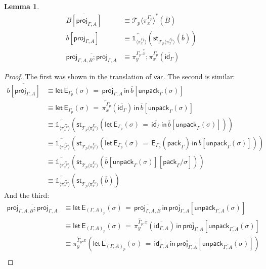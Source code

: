 \documentclass[10pt]{article}
\newtheorem{lemma}{Lemma}
\theoremstyle{definition}
\newcommand{\id}{\mathsf{id}}
\newcommand{\rewrite}[2]{\overleftarrow{#1}(#2)}
\newcommand\St[2]{\ensuremath{{#1}^*(#2)}}
\newcommand\StI[2]{\ensuremath{\mathsf{st}_{#1}(#2)}}
\newcommand\EEs[4]{\ensuremath{\mathsf{let} \, \mathsf{E}_{#1}(#3) \, = \, {#2} \, \mathsf{in} \, #4}}
\newcommand\EIs[2]{\ensuremath{\mathsf{E}_{#1}{(#2)}}}
\newcommand\ApEl[2]{\mathcal{T}_{#1}\langle#2\rangle}
\newcommand\pack[1]{\ensuremath{\mathsf{pack}_{#1}}}
\newcommand\unpack[2]{\ensuremath{\mathsf{unpack}_{#1}(#2)}}
\newcommand{\modeof}[1]{{#1}_p}
\newcommand{\upstairs}[1]{\overline{#1}}
\newcommand{\downstairs}[1]{\underline{#1}}
\newcommand\proj[1]{\ensuremath{\mathsf{proj}_{#1}}}
\newcommand\qvar[1]{\ensuremath{\mathsf{var}_{#1}}}
\newcommand\One{\ensuremath{\mathds{1}}}
\newcommand\ApOne[1]{\ensuremath{\One_{\langle {#1} \rangle }}}
\begin{document}
\begin{lemma}
\begin{align*}
\upstairs{B[\proj{\Gamma, A}]} &\equiv \St{\ApEl{p}{\pi^{\modeof{\Gamma}}_x}}{\upstairs{B}} \\
\upstairs{b[\proj{\Gamma, A}]} &\equiv \rewrite{\ApOne{\pi^{\modeof{\Gamma}}_x}}{\StI{\ApEl{p}{\pi^{\modeof{\Gamma}}_x}}{\upstairs{b}}} \\
\upstairs{\proj{\Gamma, A, B};\proj{\Gamma, A}} &\equiv \rewrite{\pi^{\modeof{\Gamma}.x}_y;\pi^{\modeof{\Gamma}}_x}{\upstairs{\id_{\Gamma}}}
\end{align*}
\end{lemma}
\begin{proof}
The first was shown in the translation of $\qvar{}$. The second is similar:
\begin{align*}
\upstairs{b[\proj{\Gamma, A}]}
&\equiv \EEs{\modeof{\Gamma}}{\upstairs{\proj{\Gamma, A}}}{\sigma}{\upstairs{b}[\unpack{\Gamma}{\sigma}]} \\
&\equiv \EEs{\modeof{\Gamma}}{\rewrite{\pi^{\modeof{\Gamma}}_x}{\upstairs{\id_\Gamma}}}{\sigma}{\upstairs{b}[\unpack{\Gamma}{\sigma}]} \\
&\equiv \rewrite{\ApOne{\pi^{\modeof{\Gamma}}_x}}{\StI{\ApEl{p}{\pi^{\modeof{\Gamma}}_x}}{\EEs{\modeof{\Gamma}}{\upstairs{\id_\Gamma}}{\sigma}{\upstairs{b}[\unpack{\Gamma}{\sigma}]}}} \\
&\equiv \rewrite{\ApOne{\pi^{\modeof{\Gamma}}_x}}{\StI{\ApEl{p}{\pi^{\modeof{\Gamma}}_x}}{\EEs{\modeof{\Gamma}}{\EIs{\modeof{\Gamma}}{\pack{\downstairs{\Gamma}}}}{\sigma}{\upstairs{b}[\unpack{\Gamma}{\sigma}]}}} \\
&\equiv \rewrite{\ApOne{\pi^{\modeof{\Gamma}}_x}}{\StI{\ApEl{p}{\pi^{\modeof{\Gamma}}_x}}{\upstairs{b}[\unpack{\Gamma}{\sigma}][\pack{\downstairs{\Gamma}}/\sigma]}} \\
&\equiv \rewrite{\ApOne{\pi^{\modeof{\Gamma}}_x}}{\StI{\ApEl{p}{\pi^{\modeof{\Gamma}}_x}}{\upstairs{b}}}
\end{align*}
And the third:
\begin{align*}
\upstairs{\proj{\Gamma, A, B};\proj{\Gamma, A}} 
&\equiv \EEs{\modeof{(\Gamma, A)}}{\upstairs{\proj{\Gamma, A, B}}}{\sigma}{\upstairs{\proj{\Gamma, A}}[\unpack{\upstairs{\Gamma, A}}{\sigma}]} \\
&\equiv \EEs{\modeof{(\Gamma, A)}}{\rewrite{\pi^{\modeof{\Gamma}.x}_y}{\upstairs{\id_{\Gamma, A}}}}{\sigma}{\upstairs{\proj{\Gamma, A}}[\unpack{\upstairs{\Gamma, A}}{\sigma}]} \\
&\equiv \rewrite{\pi^{\modeof{\Gamma}.x}_y}{\EEs{\modeof{(\Gamma, A)}}{\upstairs{\id_{\Gamma, A}}}{\sigma}{\upstairs{\proj{\Gamma, A}}[\unpack{\upstairs{\Gamma, A}}{\sigma}]}} \\

\end{align*}
\end{proof}
\end{document}
